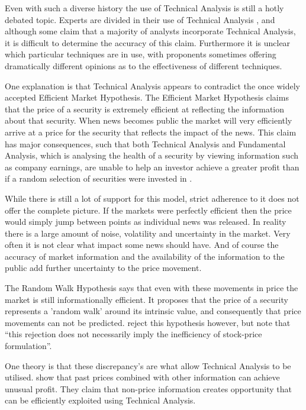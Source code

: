 \documentclass{article}
\begin{document}
Even with such a diverse history the use of Technical Analysis is still a hotly debated topic. Experts are divided in their use of Technical Analysis \citep{foundations}, and although some claim that a majority of analysts incorporate Technical Analysis, it is difficult to determine the accuracy of this claim. Furthermore it is unclear which particular techniques are in use, with proponents sometimes offering dramatically different opinions as to the effectiveness of different techniques.

One explanation is that Technical Analysis appears to contradict the once widely accepted Efficient Market Hypothesis. The Efficient Market Hypothesis claims that the price of a security is extremely efficient at reflecting the information about that security. When news becomes public the market will very efficiently arrive at a price for the security that reflects the impact of the news. This claim has major consequences, such that both Technical Analysis and Fundamental Analysis, which is analysing the health of a security by viewing information such as company earnings, are unable to help an investor achieve a greater profit than if a random selection of securities were invested in \citep{emhAndCritics}. 

While there is still a lot of support for this model, strict adherence to it does not offer the complete picture. If the markets were perfectly efficient then the price would simply jump between points as individual news was released. In reality there is a large amount of noise, volatility and uncertainty in the market. Very often it is not clear what impact some news should have. And of course the accuracy of market information and the availability of the information to the public add further uncertainty to the price movement.

The Random Walk Hypothesis says that even with these movements in price the market is still informationally efficient. It proposes that the price of a security represents a 'random walk' around its intrinsic value, and consequently that price movements can not be predicted. \cite{lo1988} reject this hypothesis however, but note that ``this rejection does not necessarily imply the inefficiency of stock-price formulation''.

One theory is that these discrepancy's are what allow Technical Analysis to be utilised. \cite{indefenseof} show that past prices combined with other information can achieve unusual profit. They claim that non-price information creates opportunity that can be efficiently exploited using Technical Analysis. 
\end{document}
